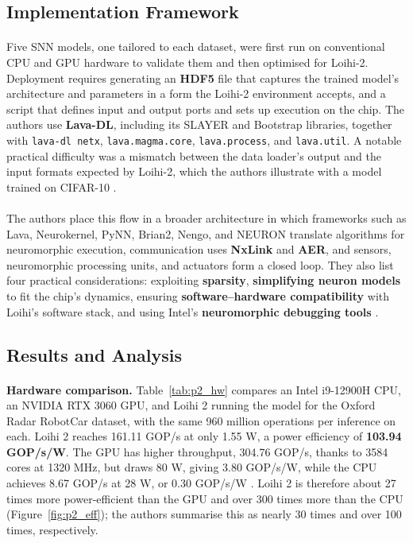 \documentclass[12pt,a4paper,final]{extreport}
\begin{document}
\subsection{Implementation Framework}

\paragraph{} Five SNN models, one tailored to each dataset, were first run on conventional CPU and GPU hardware to validate them and then optimised for Loihi-2. Deployment requires generating an \textbf{HDF5} file that captures the trained model's architecture and parameters in a form the Loihi-2 environment accepts, and a script that defines input and output ports and sets up execution on the chip. The authors use \textbf{Lava-DL}, including its SLAYER and Bootstrap libraries, together with \texttt{lava-dl netx}, \texttt{lava.magma.core}, \texttt{lava.process}, and \texttt{lava.util}. A notable practical difficulty was a mismatch between the data loader's output and the input formats expected by Loihi-2, which the authors illustrate with a model trained on CIFAR-10 \cite{p2}.

\paragraph{} The authors place this flow in a broader architecture in which frameworks such as Lava, Neurokernel, PyNN, Brian2, Nengo, and NEURON translate algorithms for neuromorphic execution, communication uses \textbf{NxLink} and \textbf{AER}, and sensors, neuromorphic processing units, and actuators form a closed loop. They also list four practical considerations: exploiting \textbf{sparsity}, \textbf{simplifying neuron models} to fit the chip's dynamics, ensuring \textbf{software--hardware compatibility} with Loihi's software stack, and using Intel's \textbf{neuromorphic debugging tools} \cite{p2}.

\subsection{Results and Analysis}

\paragraph{} \textbf{Hardware comparison.} Table~\ref{tab:p2_hw} compares an Intel i9-12900H CPU, an NVIDIA RTX 3060 GPU, and Loihi 2 running the model for the Oxford Radar RobotCar dataset, with the same 960 million operations per inference on each. Loihi 2 reaches 161.11 GOP/s at only 1.55 W, a power efficiency of \textbf{103.94 GOP/s/W}. The GPU has higher throughput, 304.76 GOP/s, thanks to 3584 cores at 1320 MHz, but draws 80 W, giving 3.80 GOP/s/W, while the CPU achieves 8.67 GOP/s at 28 W, or 0.30 GOP/s/W \cite{p2}. Loihi 2 is therefore about 27 times more power-efficient than the GPU and over 300 times more than the CPU (Figure~\ref{fig:p2_eff}); the authors summarise this as nearly 30 times and over 100 times, respectively.
\end{document}
